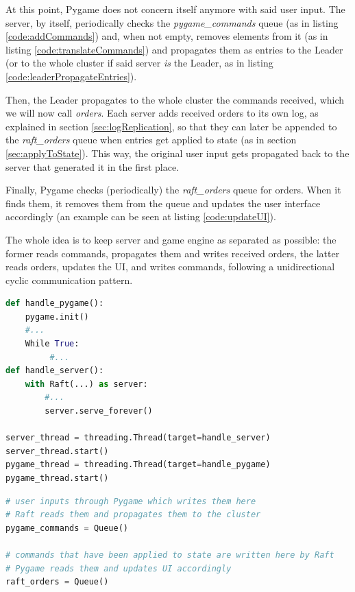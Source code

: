 At this point, Pygame does not concern itself anymore with said user input. The server, by itself, periodically checks the \textit{pygame\_commands} queue (as in listing \ref{code:addCommands}) and, when not empty, removes elements from it (as in listing \ref{code:translateCommands}) and propagates them as entries to the Leader (or to the whole cluster if said server \textit{is} the Leader, as in listing \ref{code:leaderPropagateEntries}).

Then, the Leader propagates to the whole cluster the commands received, which we will now call \textit{orders}. Each server adds received orders to its own log, as explained in section \ref{sec:logReplication}, so that they can later be appended to the \textit{raft\_orders} queue when entries get applied to state (as in section \ref{sec:applyToState}). This way, the original user input gets propagated back to the server that generated it in the first place.

Finally, Pygame checks (periodically) the \textit{raft\_orders} queue for orders. When it finds them, it removes them from the queue and updates the user interface accordingly (an example can be seen at listing \ref{code:updateUI}).

The whole idea is to keep server and game engine as separated as possible: the former reads commands, propagates them and writes received orders, the latter reads orders, updates the UI, and writes commands, following a unidirectional cyclic communication pattern.

\begin{lstlisting}[language={Python},label={code:startMainThreads}, caption={Start both Pygame and server's threads}]
def handle_pygame():
    pygame.init()
    #...
    While True:
         #...
def handle_server():
    with Raft(...) as server:
        #...
        server.serve_forever()

server_thread = threading.Thread(target=handle_server)
server_thread.start()
pygame_thread = threading.Thread(target=handle_pygame)
pygame_thread.start()
\end{lstlisting}

\begin{lstlisting}[language={Python},label={code:queues}, caption={Queues for commands and orders, they allow inter-thread communication}]
# user inputs through Pygame which writes them here
# Raft reads them and propagates them to the cluster
pygame_commands = Queue()

# commands that have been applied to state are written here by Raft
# Pygame reads them and updates UI accordingly 
raft_orders = Queue()
\end{lstlisting}

